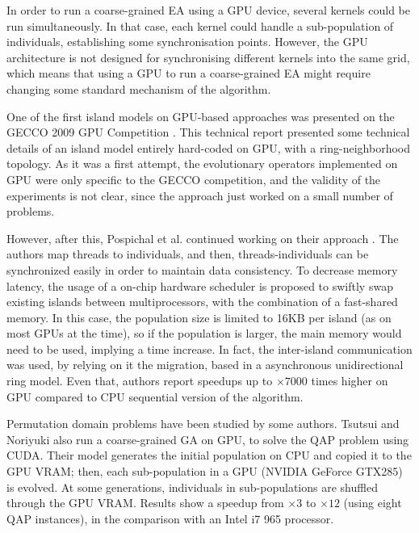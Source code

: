 \documentclass{article}
\begin{document}

In order to run a coarse-grained EA using a GPU device, several kernels could be run simultaneously.
In that case, each kernel could handle a sub-population of individuals, establishing some synchronisation points.
However, the GPU architecture is not designed for synchronising
different kernels into the same grid, which means that using a GPU to
run a coarse-grained EA might require changing some standard mechanism
of the algorithm. 


One of the first island models on GPU-based approaches was presented on the GECCO 2009 GPU Competition \cite{gecco2009CompetitionPospichal}. This technical report presented some technical details of an island model entirely hard-coded on GPU, with a ring-neighborhood topology. As it was a first attempt, the evolutionary operators implemented on GPU were only specific to the GECCO competition, and the validity of the experiments is not clear, since the approach just worked on a small number of problems.

However, after this, Pospichal et al. continued working on their approach \cite{pospichalParallelGeneticAlgorithOnCUDA2010,9253}. The authors map threads to individuals, and then, threads-individuals can be synchronized easily in order to maintain data consistency. To decrease memory latency, the usage of a on-chip hardware scheduler is proposed to swiftly swap existing islands between multiprocessors, with the combination of a fast-shared memory. In this case, the population size is limited to 16KB per island (as on most GPUs at the time), so if the population is larger, the main memory would need to be used, implying a time increase. In fact, the inter-island communication was used, by relying on it the migration, based in a asynchronous unidirectional ring model. Even that, authors report speedups up to $\times7000$ times higher on GPU compared to CPU sequential version of the algorithm.

Permutation domain problems have been studied by some authors. Tsutsui and Noriyuki \cite{1570355} also run a coarse-grained GA on GPU, to solve the QAP problem using CUDA. Their model generates the initial population on CPU and copied it to the GPU VRAM; then, each sub-population in a GPU (NVIDIA GeForce GTX285) is evolved. At some generations, individuals in sub-populations are shuffled through the GPU VRAM. Results show a speedup from $\times3$ to $\times12$ (using eight QAP instances), in the comparison with an Intel i7 965 processor. 
\end{document}
